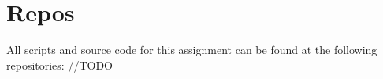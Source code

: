 \section{Repos} \label{repos}

All scripts and source code for this assignment can be found at the following repositories:
//TODO

